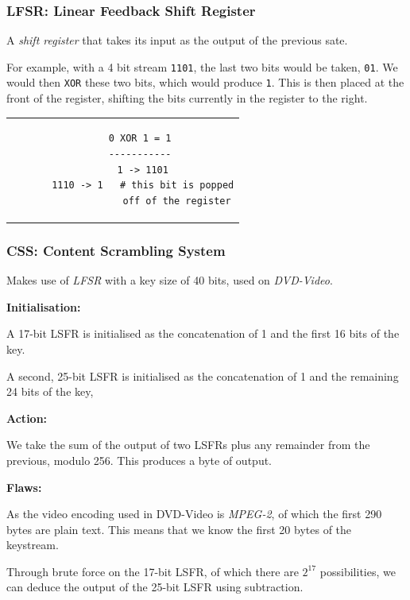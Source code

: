 \documentclass{article}
\begin{document}
\subsubsection{LFSR: Linear Feedback Shift Register}

A \textit{shift register} that takes its input as the output of the previous sate.

For example, with a 4 bit stream \texttt{1101}, the last two bits would be taken, \texttt{01}. We would then \texttt{XOR} these two bits, which would produce \texttt{1}. This is then placed at the front of the register, shifting the bits currently in the register to the right.

\begin{center}
  \begin{tabular}{c}
    \begin{lstlisting}
      0 XOR 1 = 1
      -----------
       1 -> 1101
       1110 -> 1   # this bit is popped
                   off of the register
    \end{lstlisting}
  \end{tabular}
\end{center}

\subsubsection{CSS: Content Scrambling System}

Makes use of \textit{LFSR} with a key size of 40 bits, used on \textit{DVD-Video}.

\textbf{Initialisation:}

A 17-bit LSFR is initialised as the concatenation of 1 and the first 16 bits of the key.

A second, 25-bit LSFR is initialised as the concatenation of 1 and the remaining 24 bits of the key,

\textbf{Action:}

We take the sum of the output of two LSFRs plus any remainder from the previous, modulo 256. This produces a byte of output.

\textbf{Flaws:}

As the video encoding used in DVD-Video is \textit{MPEG-2}, of which the first 290 bytes are plain text. This means that we know the first 20 bytes of the keystream.

Through brute force on the 17-bit LSFR, of which there are $2^{17}$ possibilities, we can deduce the output of the 25-bit LSFR using subtraction.
\end{document}
